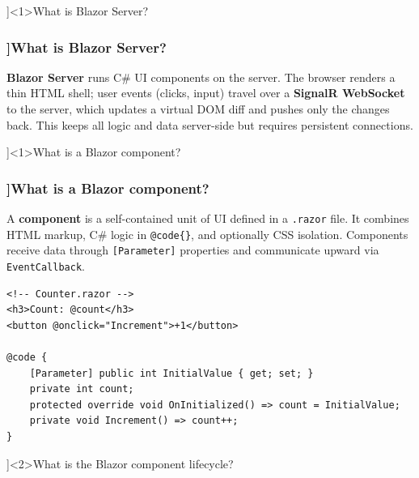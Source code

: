 
\QuestionSlide[\CategoryBadge[BlazorColor!20]{Blazor Server}]<1>{What is Blazor Server?}

\begin{frame}[fragile]
  \frametitle{\AnswerTitle[\CategoryBadge[BlazorColor!20]{Blazor Server}]{What is Blazor Server?}}

  {\footnotesize
  \textbf{Blazor Server} runs C\# UI components on the server. The browser renders a thin HTML shell; user events (clicks, input) travel over a \textbf{SignalR WebSocket} to the server, which updates a virtual DOM diff and pushes only the changes back. This keeps all logic and data server-side but requires persistent connections.
  }
\end{frame}

\QuestionSlide[\CategoryBadge[BlazorColor!20]{Blazor Server}]<1>{What is a Blazor component?}

\begin{frame}[fragile]
  \frametitle{\AnswerTitle[\CategoryBadge[BlazorColor!20]{Blazor Server}]{What is a Blazor component?}}

  {\footnotesize
  A \textbf{component} is a self-contained unit of UI defined in a \texttt{.razor} file. It combines HTML markup, C\# logic in \texttt{@code\{\}}, and optionally CSS isolation. Components receive data through \texttt{[Parameter]} properties and communicate upward via \texttt{EventCallback}.
  }

  \begin{verbatim}
<!-- Counter.razor -->
<h3>Count: @count</h3>
<button @onclick="Increment">+1</button>

@code {
    [Parameter] public int InitialValue { get; set; }
    private int count;
    protected override void OnInitialized() => count = InitialValue;
    private void Increment() => count++;
}
  \end{verbatim}
\end{frame}

\QuestionSlide[\CategoryBadge[BlazorColor!20]{Blazor Server}]<2>{What is the Blazor component lifecycle?}


